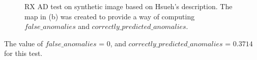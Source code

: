 \begin{figure}[H]
\begin{minipage}[]{.5\linewidth}
\end{minipage}


\caption{RX AD test on synthetic image based on Hsueh's description. The map in (b) was created to provide a way of computing $false\_anomalies$ and $ correctly\_predicted\_anomalies$.  }
\label{fig:hsueh_image_RX_test}
\end{figure}

The value of $false\_anomalies$ = 0, and  $correctly\_predicted\_anomalies$ = $0.3714$ for this test.

